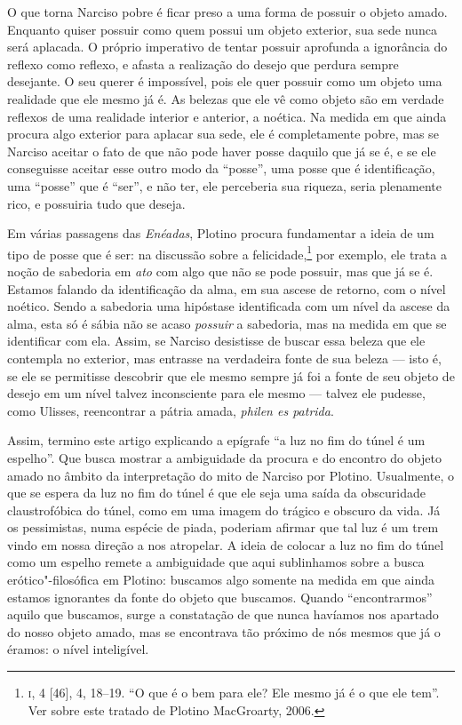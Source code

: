 O que torna Narciso pobre é ficar preso a uma forma de possuir o
objeto amado. Enquanto quiser possuir como quem possui um objeto
exterior, sua sede nunca será aplacada. O próprio imperativo de
tentar possuir aprofunda a ignorância do reflexo como reflexo, e
afasta a realização do desejo que perdura sempre desejante. O seu
querer é impossível, pois ele quer possuir como um objeto uma
realidade que ele mesmo já é. As belezas que ele vê como objeto são
em verdade reflexos de uma realidade interior e anterior, a noética.
Na medida em que ainda procura algo exterior para aplacar sua sede,
ele é completamente pobre, mas se Narciso aceitar o fato de que não
pode haver posse daquilo que já se é, e se ele conseguisse aceitar
esse outro modo da “posse”, uma posse que é identificação, uma
“posse” que é “ser”, e não ter, ele perceberia sua riqueza, seria
plenamente rico, e possuiria tudo que deseja. 

Em várias passagens das \emph{Enéadas}, Plotino procura fundamentar
a ideia de um tipo de posse que é ser: na discussão sobre a
felicidade,\footnote{ \textsc{i}, 4 [46], 4, 18--19. “O que é o bem para ele?
Ele mesmo já é o que ele tem”. Ver sobre este tratado de Plotino
MacGroarty, 2006.} por exemplo, ele trata a noção de sabedoria em
\emph{ato} com algo que não se pode possuir, mas que já se é.
Estamos falando da identificação da alma, em sua ascese de retorno,
com o nível noético. Sendo a sabedoria uma hipóstase identificada com
um nível da ascese da alma, esta só é sábia não se acaso
\emph{possuir} a sabedoria, mas na medida em que se identificar com
ela.  Assim, se Narciso desistisse de buscar essa beleza que ele
contempla no exterior, mas entrasse na verdadeira fonte de sua beleza
--- isto é, se ele se permitisse descobrir que ele mesmo sempre já foi
a fonte de seu objeto de desejo em um nível talvez inconsciente para
ele mesmo --- talvez ele pudesse, como Ulisses, reencontrar a pátria
amada, \emph{philen es patrida}. 
\bigskip

Assim, termino este artigo explicando a epígrafe “a luz no fim do
túnel é um espelho”. Que busca mostrar a ambiguidade da procura e do
encontro do objeto amado no âmbito da interpretação do mito de
Narciso por Plotino. Usualmente, o que se espera da luz no fim do
túnel é que ele seja uma saída da obscuridade claustrofóbica do
túnel, como em uma imagem do trágico e obscuro da vida. Já os
pessimistas, numa espécie de piada, poderiam afirmar que tal luz é um
trem vindo em nossa direção a nos atropelar. A ideia de colocar a luz
no fim do túnel como um espelho remete a ambiguidade que aqui
sublinhamos sobre a busca erótico"-filosófica em Plotino: buscamos
algo somente na medida em que ainda estamos ignorantes da fonte do
objeto que buscamos. Quando “encontrarmos” aquilo que buscamos, surge
a constatação de que nunca havíamos nos apartado do nosso objeto
amado, mas se encontrava tão próximo de nós mesmos que já o éramos: o
nível inteligível.

